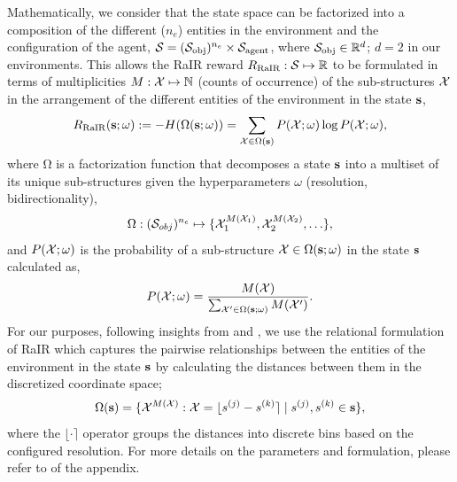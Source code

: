 Mathematically, we consider that the state space can be factorized into a composition of the different (\(n_e\)) entities in the environment and the configuration of the agent, \(\mathcal{S} = (\mathcal{S}_{\text{obj}})^{n_e} \times \mathcal{S}_{\text{agent}}\), where \(\mathcal{S}_{\text{obj}} \in \mathbb{R}^d\); \(d = 2\) in our environments. %
This allows the RaIR reward \(R_{\text{RaIR}}: \mathcal{S} \mapsto \mathbb{R}\) to be formulated in terms of multiplicities \(M: \mathcal{X} \mapsto \mathbb{N}\) (counts of occurrence) of the sub-structures \(\mathcal{X}\) in the arrangement of the different entities of the environment in the state \(\mathbf{s}\),
\begin{equation}
    \label{eq:rair}
    R_{\text{RaIR}}(\mathbf{s}; \omega) := -H(\mathrm{\Omega}(\mathbf{s}; \omega)) = \sum_{\mathcal{X} \in \mathrm{\Omega}(\mathbf{s})} P(\mathcal{X}; \omega) \log P(\mathcal{X}; \omega),
\end{equation}
where \(\mathrm{\Omega}\) is a factorization function that decomposes a state \(\mathbf{s}\) into a multiset of its unique sub-structures given the hyperparameters \(\omega\) (resolution, bidirectionality),
\begin{equation}
    \label{eq:rair-factorization}
    \mathrm{\Omega} : (\mathcal{S}_{obj})^{n_e} \mapsto \{ \mathcal{X}_1^{M(\mathcal{X}_1)}, \mathcal{X}_2^{M(\mathcal{X}_2)}, \ldots \},
\end{equation}
and \(P(\mathcal{X}; \omega)\) is the probability of a sub-structure \(\mathcal{X} \in \mathrm{\Omega}(\mathbf{s}; \omega)\) in the state \(\mathbf{s}\) calculated as,
\begin{equation}
    \label{eq:rair-probability}
    P(\mathcal{X}; \omega) = \dfrac{M(\mathcal{X})}{\sum_{\mathcal{X}' \in \mathrm{\Omega}(\mathbf{s}; \omega)} M(\mathcal{X}')}.
\end{equation}
% 
For our purposes, following insights from \cite{symmetry} and \cite{compositional}, we use the relational formulation of RaIR which captures the pairwise relationships between the entities of the environment in the state \(\mathbf{s}\) by calculating the distances between them in the discretized coordinate space;
\begin{equation}
    \label{eq:rair-relational}
    \mathrm{\Omega}(\mathbf{s}) = \{ \mathcal{X}^{M(\mathcal{X})} : \mathcal{X} = \lfloor s^{(j)} - s^{(k)} \rceil \mid s^{(j)}, s^{(k)} \in \mathbf{s} \},
\end{equation}
where the \(\lfloor \cdot \rceil\) operator groups the distances into discrete bins based on the configured resolution.
For more details on the parameters and formulation, please refer to  of the appendix.

